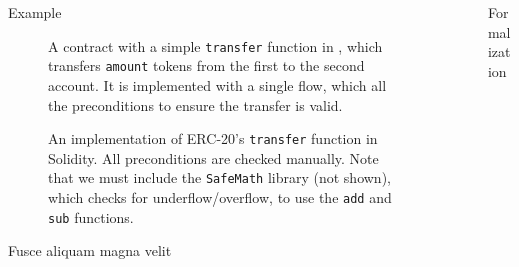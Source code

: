 \documentclass[usenames, dvipsnames, final]{beamer}
\newlength{\sepwidth}
\newlength{\colwidth}
\newcommand{\separatorcolumn}{\begin{column}{\sepwidth}\end{column}}
\begin{document}
\begin{frame}[t]
\begin{columns}[t]
\begin{column}{\colwidth}
  \begin{block}{Example}
    \begin{figure}[h]
        \centering
        
        \caption{A contract with a simple \lstinline{transfer} function in \langName, which transfers \lstinline{amount} tokens from the first to the second account.
    It is implemented with a single flow, which all the preconditions to ensure the transfer is valid.}
        \label{fig:erc20-transfer-flow}
    \end{figure}
    \begin{figure}[h]
        \centering
        
        \caption{An implementation of ERC-20's \lstinline{transfer} function in Solidity.
            All preconditions are checked manually.
            Note that we must include the \lstinline{SafeMath} library (not shown), which checks for underflow/overflow, to use the \lstinline{add} and \lstinline{sub} functions.}
        \label{fig:erc20-transfer-sol}
    \end{figure}
  \end{block}

  \begin{block}{Fusce aliquam magna velit}
  \end{block}
\end{column}

\separatorcolumn

\begin{column}{\colwidth}
    \begin{block}{Formalization}


\end{block}
\end{column}
\end{columns}
\end{frame}
\end{document}

